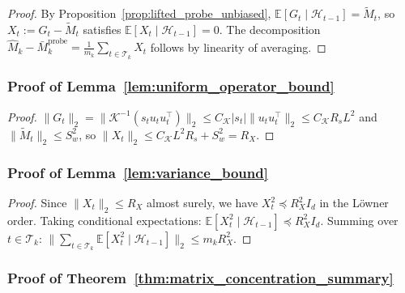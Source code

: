 \documentclass{article}
\newcommand{\E}{\mathbb{E}}
\newcommand{\cH}{\mathcal{H}}
\newcommand{\cT}{\mathcal{T}}
\begin{document}
\begin{proof}
By Proposition~\ref{prop:lifted_probe_unbiased}, $\E[G_t \mid \cH_{t-1}] = \widetilde{M}_t$, so $X_t := G_t - \widetilde{M}_t$ satisfies $\E[X_t \mid \cH_{t-1}] = 0$.
The decomposition $\widehat{M}_k - \bar{M}_k^{\mathrm{probe}} = \frac{1}{m_k}\sum_{t \in \cT_k} X_t$ follows by linearity of averaging.
\end{proof}

\subsubsection{Proof of Lemma~\ref{lem:uniform_operator_bound}}
\label{proof:uniform_operator_bound}

\begin{proof}
$\|G_t\|_2 = \|\mathcal K^{-1}(s_t u_t u_t^\top)\|_2 \le C_{\mathcal K} |s_t| \|u_t u_t^\top\|_2 \le C_{\mathcal K} R_s L^2$ and $\|\widetilde{M}_t\|_2 \le S_w^2$, so $\|X_t\|_2 \le C_{\mathcal K} L^2 R_s + S_w^2 = R_X$.
\end{proof}

\subsubsection{Proof of Lemma~\ref{lem:variance_bound}}
\label{proof:variance_bound}

\begin{proof}
Since $\|X_t\|_2 \le R_X$ almost surely, we have $X_t^2 \preceq R_X^2 I_d$ in the L\"owner order.
Taking conditional expectations: $\E[X_t^2 \mid \cH_{t-1}] \preceq R_X^2 I_d$.
Summing over $t \in \cT_k$: $\|\sum_{t \in \cT_k} \E[X_t^2 \mid \cH_{t-1}]\|_2 \le m_k R_X^2$.
\end{proof}

\subsubsection{Proof of Theorem~\ref{thm:matrix_concentration_summary}}
\label{proof:matrix_concentration}
\end{document}
